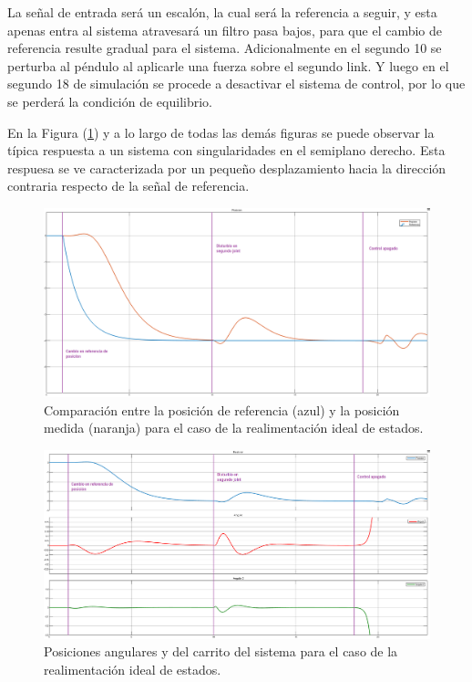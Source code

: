 %
%
%
La señal de entrada será un escalón, la cual será la referencia a seguir, y esta apenas entra al sistema atravesará un filtro pasa bajos, para que el cambio de referencia resulte gradual para el sistema.
Adicionalmente en el segundo 10 se perturba al péndulo al aplicarle una fuerza sobre el segundo link. Y luego en el segundo 18 de simulación se procede a desactivar el sistema de control, por lo que se perderá la condición de equilibrio.

En la Figura (\ref{fig:realim_posref}) y a lo largo de todas las demás figuras se puede observar la típica respuesta a un sistema con singularidades en el semiplano derecho. Esta respuesa se ve caracterizada por un pequeño desplazamiento hacia la dirección contraria respecto de la señal de referencia.

\begin{figure}[H]
	\centering
	\includegraphics[width=\linewidth]{../Analisis de Resultados/ImagenesAnalisis de Resultados/realim_posref.png}
	\caption{Comparación entre la posición de referencia (azul) y la posición medida (naranja) para el caso de la realimentación ideal de estados.}	
	\label{fig:realim_posref}
\end{figure}

\begin{figure}[H]
	\centering
	\includegraphics[width=\linewidth]{../Analisis de Resultados/ImagenesAnalisis de Resultados/realim_vars.png}
	\caption{Posiciones angulares y del carrito del sistema para el caso de la realimentación ideal de estados.}	
	\label{fig:realim_vars}
\end{figure}

